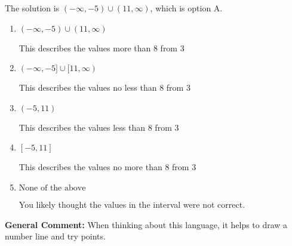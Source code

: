 \documentclass{extbook}[14pt]
\begin{document}
\begin{enumerate}
{The solution is \( (-\infty, -5) \cup (11, \infty) \), which is option A.\begin{enumerate}[label=\Alph*.]
\item \( (-\infty, -5) \cup (11, \infty) \)

This describes the values more than 8 from 3
\item \( (-\infty, -5] \cup [11, \infty) \)

This describes the values no less than 8 from 3
\item \( (-5, 11) \)

This describes the values less than 8 from 3
\item \( [-5, 11] \)

This describes the values no more than 8 from 3
\item \( \text{None of the above} \)

You likely thought the values in the interval were not correct.
\end{enumerate}

\textbf{General Comment:} When thinking about this language, it helps to draw a number line and try points.
}
\end{enumerate}
\end{document}
